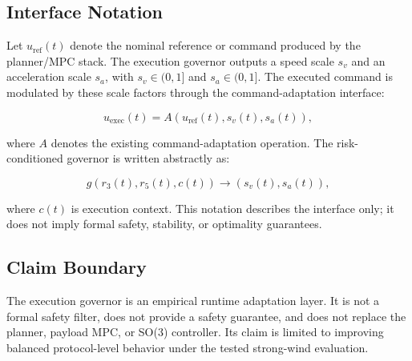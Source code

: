 \subsection{Interface Notation}

Let $u_{\mathrm{ref}}(t)$ denote the nominal reference or command produced by
the planner/MPC stack. The execution governor outputs a speed scale $s_v$ and
an acceleration scale $s_a$, with $s_v \in (0,1]$ and $s_a \in (0,1]$. The
executed command is modulated by these scale factors through the
command-adaptation interface:

\begin{equation}
u_{\mathrm{exec}}(t) = A(u_{\mathrm{ref}}(t), s_v(t), s_a(t)),
\end{equation}

where $A$ denotes the existing command-adaptation operation. The
risk-conditioned governor is written abstractly as:

\begin{equation}
g(r_3(t), r_5(t), c(t)) \rightarrow (s_v(t), s_a(t)),
\end{equation}

where $c(t)$ is execution context. This notation describes the interface only;
it does not imply formal safety, stability, or optimality guarantees.

\subsection{Claim Boundary}

The execution governor is an empirical runtime adaptation layer. It is not a
formal safety filter, does not provide a safety guarantee, and does not replace
the planner, payload MPC, or SO(3) controller. Its claim is limited to improving
balanced protocol-level behavior under the tested strong-wind evaluation.
